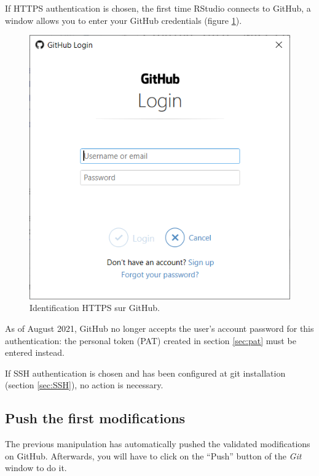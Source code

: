 \documentclass[
  12pt,
  american,
  a4paper,
  extrafontsizes,onecolumn,openright
  ]{memoir}
\begin{document}
If HTTPS authentication is chosen, the first time RStudio connects to GitHub, a window allows you to enter your GitHub credentials (figure \ref{fig:git-PAT}).



\scriptsize

\begin{figure}

{\centering \includegraphics[width=0.8\linewidth]{images/git-PAT} 

}

\caption{Identification HTTPS sur GitHub.}\label{fig:git-PAT}
\end{figure}

\normalsize

As of August 2021, GitHub no longer accepts the user's account password for this authentication: the personal token (PAT) created in section \ref{sec:pat} must be entered instead.

If SSH authentication is chosen and has been configured at git installation (section \ref{sec:SSH}), no action is necessary.

\subsection{Push the first modifications}\label{push-the-first-modifications}

The previous manipulation has automatically pushed the validated modifications on GitHub.
Afterwards, you will have to click on the \enquote{Push} button of the \emph{Git} window to do it.
\end{document}

